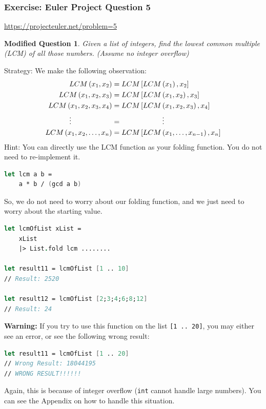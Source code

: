 \documentclass[12pt]{article}
\newtheorem*{modQuestion*}{Modified Question}
\begin{document}
\pagebreak

\subsubsection*{Exercise: Euler Project Question 5}

\url{https://projecteuler.net/problem=5}

\begin{modQuestion*}
Given a list of integers, find the lowest common multiple (LCM) of all those numbers. (Assume no integer overflow)
\end{modQuestion*}
Strategy: We make the following observation:
\begin{align*}
LCM\left(x_1, x_2\right) &= LCM\left[LCM\left(x_1\right), x_2\right]
\\LCM\left(x_1, x_2, x_3\right) &= LCM\left[LCM\left(x_1, x_2\right), x_3\right]
\\LCM\left(x_1, x_2, x_3, x_4\right) &= LCM\left[LCM\left(x_1, x_2, x_3\right), x_4\right]
\\ \vdots \hspace{2.0cm}&= \hspace{2.0cm} \vdots
\\LCM\left(x_1, x_2, \ldots, x_n\right) &= LCM\left[LCM\left(x_1, \ldots, x_{n-1}\right), x_n\right]
\end{align*}
Hint: You can directly use the LCM function as your folding function. You do not need to re-implement it. 
\begin{lstlisting}[language=FSharp]
let lcm a b = 
    a * b / (gcd a b)
\end{lstlisting}
So, we do not need to worry about our folding function, and we just need to worry about the starting value.

\begin{lstlisting}[language=FSharp]
let lcmOfList xList =
    xList
    |> List.fold lcm ........

let result11 = lcmOfList [1 .. 10]
// Result: 2520

let result12 = lcmOfList [2;3;4;6;8;12]
// Result: 24
\end{lstlisting}

{\Large \textbf{Warning:}} If you try to use this function on the list \texttt{[1 .. 20]}, you may either see an error, or see the following wrong result:
\begin{lstlisting}[language=FSharp]
let result11 = lcmOfList [1 .. 20]
// Wrong Result: 18044195
// WRONG RESULT!!!!!!
\end{lstlisting}
Again, this is because of integer overflow (\texttt{int} cannot handle large numbers). You can see the Appendix on how to handle this situation.
\end{document}
